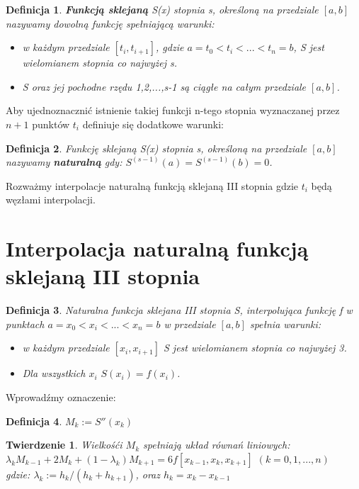 \documentclass{article}
\newtheorem{defi}{Definicja}
\newtheorem{twr}{Twierdzenie}
\begin{document}
\begin{defi}
	\textbf{Funkcją sklejaną} S(x) stopnia s, określoną na przedziale $[a,b]$ nazywamy dowolną funkcję spełniającą warunki:
	
	\begin{itemize}
		\item w każdym przedziale $[t_i,t_{i+1}]$, gdzie $a = t_0 < t_i <...<t_n = b$, S jest wielomianem stopnia co najwyżej s.
		\item S oraz jej pochodne rzędu 1,2,...,s-1 są ciągłe na całym przedziale $[a,b]$.
	\end{itemize}
\end{defi}

\noindent Aby ujednoznacznić istnienie takiej funkcji n-tego stopnia wyznaczanej przez $n+1$ punktów $t_i$ definiuje się dodatkowe warunki:

\begin{defi}
	Funkcję sklejaną S(x) stopnia s, określoną na przedziale $[a,b]$
	nazywamy \textbf{naturalną} gdy:
	$S^{(s-1)}(a) = S^{(s-1)}(b) = 0$.
\end{defi}

Rozważmy interpolacje naturalną funkcją sklejaną III stopnia gdzie $t_i$ będą węzłami interpolacji.

\section{Interpolacja naturalną funkcją sklejaną III stopnia}

\begin{defi}
	Naturalna funkcja sklejana III stopnia S, interpolująca funkcję f w punktach $a = x_0 < x_i <...<x_n = b$ w przedziale $[a,b]$ spełnia warunki:
	
	\begin{itemize}
		\item w każdym przedziale $[x_i,x_{i+1}]$ S jest wielomianem stopnia co najwyżej 3.
		\item Dla wszystkich $x_i$ $S(x_i) = f(x_i)$.
	\end{itemize}
	
\end{defi}

\noindent Wprowadźmy oznaczenie:

\begin{defi}
	$M_k := S''(x_k)$
\end{defi}

\begin{twr}
	Wielkośći $M_k$ spełniają układ równań liniowych:\\
	$\lambda_k M_{k-1} + 2M_k + (1-\lambda_k) M_{k+1} = 6f[x_{k-1},x_k,x_{k+1}]$ \hfill $(k=0,1,...,n)$\\
	gdzie: $\lambda_k := h_k / ( h_k + h_{k+1})$, oraz $h_k = x_k - x_{k-1}$
\end{twr}
	
\end{document}
